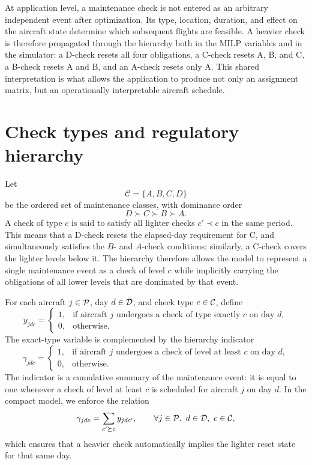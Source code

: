 At application level, a maintenance check is not entered as an arbitrary
independent event after optimization. Its type, location, duration, and effect
on the aircraft state determine which subsequent flights are feasible. A
heavier check is therefore propagated through the hierarchy both in the MILP
variables and in the simulator: a D-check resets all four obligations, a
C-check resets A, B, and C, a B-check resets A and B, and an A-check resets
only A. This shared interpretation is what allows the application to produce
not only an assignment matrix, but an operationally interpretable aircraft
schedule.

\section{Check types and regulatory hierarchy}
\label{sec:hierarchy_regime}

Let
\begin{equation}
    \mathcal{C} = \{A,B,C,D\}
\end{equation}
be the ordered set of maintenance classes, with dominance order
\begin{equation}
    D \succ C \succ B \succ A.
\end{equation}
A check of type $c$ is said to satisfy all lighter checks $c' \prec c$ in the
same period. This means that a D-check resets the elapsed-day requirement for
C, and simultaneously satisfies the $B$- and $A$-check conditions; similarly, a
C-check covers the lighter levels below it. The hierarchy therefore allows the
model to represent a single maintenance event as a check of level $c$ while
implicitly carrying the obligations of all lower levels that are dominated by
that event.

For each aircraft $j \in \mathcal{P}$, day $d \in \mathcal{D}$, and check type $c \in \mathcal{C}$, define
\begin{equation}
    y_{jdc} =
    \begin{cases}
        1, & \text{if aircraft } j \text{ undergoes a check of type exactly } c \text{ on day } d,\\
        0, & \text{otherwise.}
    \end{cases}
\end{equation}
The exact-type variable is complemented by the hierarchy indicator
\begin{equation}
    \gamma_{jdc} =
    \begin{cases}
        1, & \text{if aircraft } j \text{ undergoes a check of level at least } c \text{ on day } d,\\
        0, & \text{otherwise.}
    \end{cases}
\end{equation}
The indicator is a cumulative summary of the maintenance event: it is equal to
one whenever a check of level at least $c$ is scheduled for aircraft $j$ on day
$d$. In the compact model, we enforce the relation
\begin{equation}
    \gamma_{jdc} = \sum_{c' \succeq c} y_{jdc'},
    \qquad \forall j \in \mathcal{P},\ d \in \mathcal{D},\ c\in\mathcal{C},
\end{equation}
which ensures that a heavier check automatically implies the lighter reset state
for that same day.

